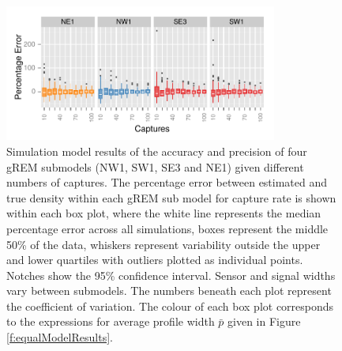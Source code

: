 \begin{knitrout}\footnotesize
{}\color{fgcolor}\begin{figure}[t]

{\centering \includegraphics[width=0.8\textwidth]{figure/Captures-1} 

}

\caption[Simulation model results of the accuracy and precision of four gREM submodels]{
Simulation model results of the accuracy and precision of four gREM submodels (NW1, SW1, SE3 and NE1) given different numbers of captures.
The percentage error between estimated and true density within each gREM sub model for capture rate is shown within each box plot, where the white line represents the median percentage error across all simulations, boxes represent the middle 50\% of the data, whiskers represent variability outside the upper and lower quartiles with outliers plotted as individual points.
Notches show the 95\% confidence interval.
Sensor and signal widths vary between submodels.
The numbers beneath each plot represent the coefficient of variation.
The colour of each box plot corresponds to the expressions for average profile width $\bar{p}$ given in Figure \ref{f:equalModelResults}. 
}\label{fig:Captures}
\end{figure}


\end{knitrout}


